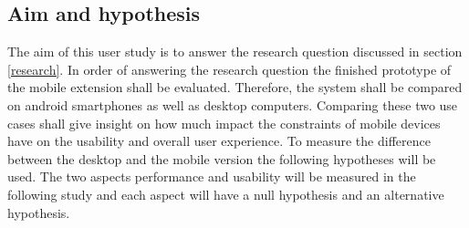 \subsection{Aim and hypothesis}
\label{aim}
The aim of this user study is to answer the research question discussed in section \ref{research}.
In order of answering the research question the finished prototype of the mobile extension shall be evaluated.
Therefore, the system shall be compared on \gls{android} smartphones as well as desktop computers.
Comparing these two use cases shall give insight on how much impact the constraints of mobile devices have on the usability and overall user experience.
To measure the difference between the desktop and the mobile version the following hypotheses will be used.
The two aspects performance and usability will be measured in the following study and each aspect will have a null hypothesis and an alternative hypothesis.
